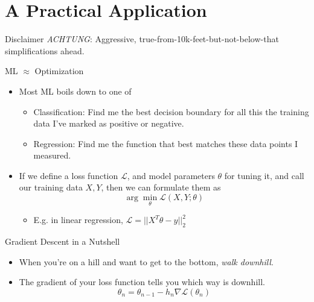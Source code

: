 \documentclass[pdf]{beamer}
\begin{document}
\section{A Practical Application}
\begin{frame}{Disclaimer}
  \emph{ACHTUNG}: Aggressive, true-from-10k-feet-but-not-below-that simplifications
  ahead.
\end{frame}
  
\begin{frame}[fragile]{ML $\approx$ Optimization}
  \begin{itemize}
  \item Most ML boils down to one of
    \begin{itemize}
    \item Classification: Find me the best decision boundary for all this the
      training data I've marked as positive or negative.
    \item Regression: Find me the function that best matches these data points I
      measured.
    \end{itemize}
    \pause
  \item If we define a loss function $\mathcal{L}$, and model parameters
    $\theta$ for tuning it, and call our training data $X, Y$, then we
    can formulate them as
    \[ \arg\min_{\theta} \mathcal{L}(X,Y;\theta) \]
    \begin{itemize}
    \item E.g. in linear regression, $\mathcal{L} = ||X^T\theta - y||_2^2$
    \end{itemize}
  \end{itemize}
\end{frame}

\begin{frame}{Gradient Descent in a Nutshell}
  \begin{itemize}
  \item When you're on a hill and want to get to the bottom, \emph{walk downhill}.
    \pause
  \item The gradient of your loss function tells you which way is downhill.
      \[ \theta_n = \theta_{n-1} - h_n \nabla \mathcal{L}(\theta_n) \]

  \end{itemize}
\end{frame}
\end{document}
